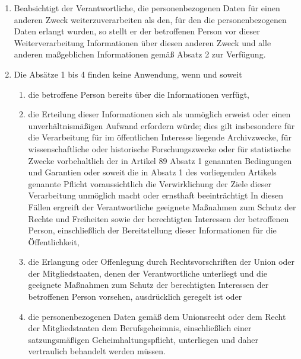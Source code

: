 \documentclass[A4, 12pt]{scrbook}
\begin{document}
\begin{enumerate}[label=(\arabic*)]
        \item Beabsichtigt der Verantwortliche, die personenbezogenen Daten für einen anderen Zweck weiterzuverarbeiten als den, für den die personenbezogenen Daten erlangt wurden, so stellt er der betroffenen Person vor dieser Weiterverarbeitung Informationen über diesen anderen Zweck und alle anderen maßgeblichen Informationen gemäß Absatz 2 zur Verfügung.
        \item Die Absätze 1 bis 4 finden keine Anwendung, wenn und soweit
        \begin{enumerate}[label=\alph*)]
            \item die betroffene Person bereits über die Informationen verfügt,
            \item die Erteilung dieser Informationen sich als unmöglich erweist oder einen unverhältnismäßigen Aufwand erfordern würde; dies gilt insbesondere für die Verarbeitung für im öffentlichen Interesse liegende Archivzwecke, für wissenschaftliche oder historische Forschungszwecke oder für statistische Zwecke vorbehaltlich der in Artikel 89 Absatz 1 genannten Bedingungen und Garantien oder soweit die in Absatz 1 des vorliegenden Artikels genannte Pflicht voraussichtlich die Verwirklichung der Ziele dieser Verarbeitung unmöglich macht oder ernsthaft beeinträchtigt In diesen Fällen ergreift der Verantwortliche geeignete Maßnahmen zum Schutz der Rechte und Freiheiten sowie der berechtigten Interessen der betroffenen Person, einschließlich der Bereitstellung dieser Informationen für die Öffentlichkeit,
            \item die Erlangung oder Offenlegung durch Rechtsvorschriften der Union oder der Mitgliedstaaten, denen der Verantwortliche unterliegt und die geeignete Maßnahmen zum Schutz der berechtigten Interessen der betroffenen Person vorsehen, ausdrücklich geregelt ist oder
            \item die personenbezogenen Daten gemäß dem Unionsrecht oder dem Recht der Mitgliedstaaten dem Berufsgeheimnis, einschließlich einer satzungsmäßigen Geheimhaltungspflicht, unterliegen und daher vertraulich behandelt werden müssen. 
        \end{enumerate}
    \end{enumerate}
\end{document}
